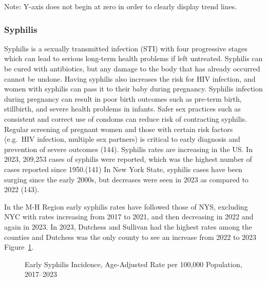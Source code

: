 \documentclass[
  english,
  letterpaper,
]{report}
\begin{document}
\begin{tcolorbox}[enhanced jigsaw, breakable, leftrule=.75mm, title=\textcolor{quarto-callout-note-color}{\faInfo}\hspace{0.5em}{Note}, bottomrule=.15mm, opacityback=0, left=2mm, colback=white, bottomtitle=1mm, coltitle=black, colbacktitle=quarto-callout-note-color!10!white, colframe=quarto-callout-note-color-frame, opacitybacktitle=0.6, toptitle=1mm, titlerule=0mm, arc=.35mm, rightrule=.15mm, toprule=.15mm]

Note: Y-axis does not begin at zero in order to clearly display trend
lines.

\end{tcolorbox}

\subsubsection{Syphilis}\label{syphilis}

Syphilis is a sexually transmitted infection (STI) with four progressive
stages which can lead to serious long-term health problems if left
untreated. Syphilis can be cured with antibiotics, but any damage to the
body that has already occurred cannot be undone. Having syphilis also
increases the risk for HIV infection, and women with syphilis can pass
it to their baby during pregnancy. Syphilis infection during pregnancy
can result in poor birth outcomes such as pre-term birth, stillbirth,
and severe health problems in infants. Safer sex practices such as
consistent and correct use of condoms can reduce risk of contracting
syphilis. Regular screening of pregnant women and those with certain
risk factors (e.g.~HIV infection, multiple sex partners) is critical to
early diagnosis and prevention of severe outcomes (144). Syphilis rates
are increasing in the US. In 2023, 209,253 cases of syphilis were
reported, which was the highest number of cases reported since
1950.(141) In New York State, syphilis cases have been surging since the
early 2000s, but decreases were seen in 2023 as compared to 2022 (143).

In the M-H Region early syphilis rates have followed those of NYS,
excluding NYC with rates increasing from 2017 to 2021, and then
decreasing in 2022 and again in 2023. In 2023, Dutchess and Sullivan had
the highest rates among the counties and Dutchess was the only county to
see an increase from 2022 to 2023 Figure~\ref{fig-syph-early-aar}.

\begin{figure}


\caption{\label{fig-syph-early-aar}Early Syphilis Incidence,
Age-Adjusted Rate per 100,000 Population, 2017--2023}

\end{figure}%
\end{document}
